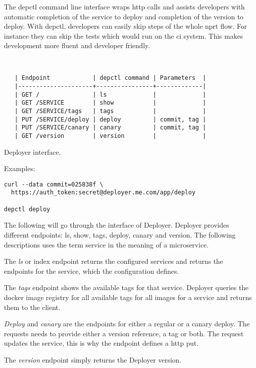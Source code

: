 The depctl command line interface wraps http calls and assists developers with automatic
completion of the service to deploy and completion of the version to deploy. With depctl,
developers can easily skip steps of the whole \gls{nprt} flow. For instance they can skip
the tests which would run on the \gls{ci} system. This makes development more fluent and
developer friendly.

\begin{table}[!htbp]
\begin{verbatim}


   | Endpoint            | depctl command | Parameters  |
   |---------------------+----------------+-------------|
   | GET /               | ls             |             |
   | GET /SERVICE        | show           |             |
   | GET /SERVICE/tags   | tags           |             |
   | PUT /SERVICE/deploy | deploy         | commit, tag |
   | PUT /SERVICE/canary | canary         | commit, tag |
   | GET /version        | version        |             |

\end{verbatim}
\caption{Deployer interface.}
\label{tab:interface}
\end{table}
Examples:
\begin{verbatim}
curl --data commit=025838f \
  https://auth_token:secret@deployer.me.com/app/deploy

depctl deploy
\end{verbatim}

The following will go through the interface of Deployer. Deployer provides different
endpoints: ls, show, tags, deploy, canary and version. The following descriptions uses the
term service in the meaning of a microservice.

The \emph{ls} or index endpoint returns the configured services and returns the endpoints
for the service, which the configuration defines.

The \emph{tags} endpoint shows the available tags for that service. Deployer queries the
docker image registry for all available tags for all images for a service and returns them
to the client.

\emph{Deploy} and \emph{canary} are the endpoints for either a regular or a canary
deploy. The requests needs to provide either a version reference, a tag or both. The
request updates the service, this is why the endpoint defines a http put.

The \emph{version} endpoint simply returns the Deployer version.

